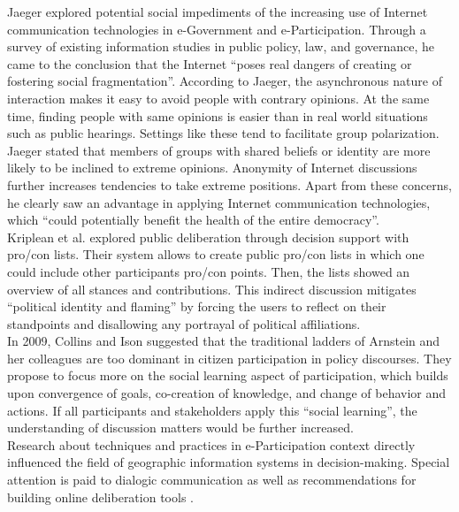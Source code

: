 Jaeger \cite{Jaeger2005_deliberate_democracy_and_egovernment} explored potential social impediments of the increasing use of Internet communication technologies in e-Government and e-Participation. Through a survey of existing information studies in public policy, law, and governance, he came to the conclusion that the Internet ``poses real dangers of creating or fostering social fragmentation''. According to Jaeger, the asynchronous nature of interaction makes it easy to avoid people with contrary opinions. At the same time, finding people with same opinions is easier than in real world situations such as public hearings. Settings like these tend to facilitate group polarization. Jaeger stated that members of groups with shared beliefs or identity are more likely to be inclined to extreme opinions. Anonymity of Internet discussions further increases tendencies to take extreme positions. Apart from these concerns, he clearly saw an advantage in applying Internet communication technologies, which ``could potentially benefit the health of the entire democracy''.\\
Kriplean et al. \cite{Kriplean2012_Considerit} explored public deliberation through decision support with pro/con lists. Their system allows to create public pro/con lists in which one could include other participants pro/con points. Then, the lists showed an overview of all stances and contributions. This indirect discussion mitigates ``political identity and flaming'' by forcing the users to reflect on their standpoints and disallowing any portrayal of political affiliations.\\
In 2009, Collins and Ison \cite{Collins2009_social_learning} suggested that the traditional ladders of Arnstein and her colleagues are too dominant in citizen participation in policy discourses. They propose to focus more on the social learning aspect of participation, which builds upon convergence of goals, co-creation of knowledge, and change of behavior and actions. If all participants and stakeholders apply this ``social learning'', the understanding of discussion matters would be further increased.\\
Research about techniques and practices in e-Participation context directly influenced the field of geographic information systems in decision-making. Special attention is paid to dialogic communication \cite{Kent1998_dialogic_relationships_through_www} as well as recommendations for building online deliberation tools \cite{Wright2007_deliberation_design,Reddick2005_Citizen_interaction_with_egovernment}.

